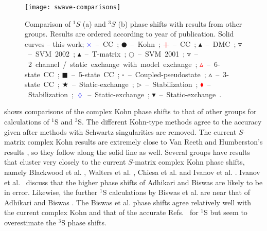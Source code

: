 \documentclass[Dissertation.tex]{subfiles}
\begin{document}
\begin{figure}
	\centering
	\texttt{[image: swave-comparisons]}
	\caption[Comparison of $^1S$ and $^3S$ phase shifts]{Comparison of $^1S$ (a) and $^3S$ (b) phase shifts
with results from other groups. Results are ordered according to year of
publication. Solid curves -- this work;
\mbox{\textcolor{blue}{$\times$} -- CC \cite{Walters2004};}
\mbox{$\CIRCLE$ -- Kohn \cite{VanReeth2003};}
\mbox{\textcolor{red}{\textbf{+}} -- CC \cite{Blackwood2002};}
\mbox{$\blacktriangle$ -- DMC \cite{Chiesa2002};} 
\mbox{$\triangledown$ -- SVM 2002 \cite{Ivanov2002};} 
\mbox{\textcolor[RGB]{0,127,0}{$\blacktriangle$} -- T-matrix \cite{Biswas2002a};} 
\mbox{$\Circle$ -- SVM 2001 \cite{Ivanov2001};} 
\mbox{\textcolor[RGB]{0,127,0}{$\triangledown$} -- 2 channel / static exchange with model exchange \cite{Biswas2001};} 
\mbox{\textcolor{red}{$\vartriangle$} -- 6-state CC \cite{Sinha2000};} 
\mbox{$\blacksquare$ -- 5-state CC \cite{Adhikari1999};} 
\mbox{$\square$ -- Coupled-pseudostate \cite{Campbell1998};} 
\mbox{$\vartriangle$ -- 3-state CC \cite{Sinha1997};} 
\mbox{\textcolor[RGB]{0,127,0}{$\bigstar$} -- Static-exchange \cite{Ray1997};} 
\mbox{$\triangleright$ -- Stabilization \cite{Drachman1976};} 
\mbox{\textcolor{red}{$\blacklozenge$} -- Stabilization \cite{Drachman1975};}
\mbox{\textcolor{blue}{$\lozenge$} -- Static-exchange \cite{Hara1975};}
\mbox{$\blacktriangledown$ -- Static-exchange \cite{Fraser1961}.}}
	\label{fig:SWaveComparisons}
\end{figure}


 shows comparisons of the complex Kohn phase 
shifts to that of other groups for calculations of $^1$S and $^3$S. The
different Kohn-type methods agree to the accuracy given after methods with
Schwartz singularities are removed. The current $S$-matrix complex Kohn results are extremely close to Van
Reeth and Humberston's results \cite{VanReeth2003}, so they 
follow along the solid line as well. Several groups have results that cluster 
very closely to the current $S$-matrix complex Kohn phase shifts, namely Blackwood et al. \cite{Blackwood2002}, Walters 
et al. \cite{Walters2004}, Chiesa et al. \cite{Chiesa2002} and Ivanov et al. \cite{Ivanov2002}. 
Ivanov et al.\ \cite{Ivanov2002} discuss that the higher phase shifts of
Adhikari and Biswas \cite{Adhikari1999} are likely to be in error. Likewise, 
the further $^1$S calculations by Biswas et al. \cite{Biswas2002a} are near 
that of Adhikari and Biswas \cite{Adhikari1999}. The Biswas et al. \cite{Biswas2001} phase shifts 
agree relatively well with the current complex Kohn and that of the accurate 
Refs.~\cite{Blackwood2002,VanReeth2003,Walters2004} for $^1$S but seem to 
overestimate the $^3$S phase shifts.
\end{document}
